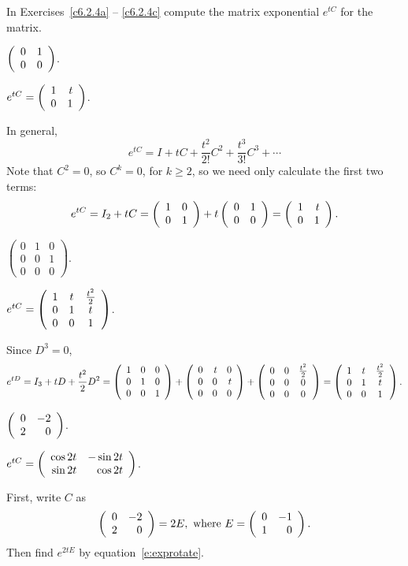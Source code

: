 \documentclass{ximera}
\begin{document}
\TEXER

\noindent In Exercises~\ref{c6.2.4a} -- \ref{c6.2.4c} compute the matrix
exponential $e^{tC}$ for the matrix.
\begin{exercise} \label{c6.2.4a}
                $\left(\begin{array}{rr} 0 & 1\\ 0 &0\end{array}\right)$.

\begin{solution}
\ans $e^{tC} = \left(\begin{array}{rr} 1 & t\\ 0 &1\end{array}\right)$.

\soln In general,
\[
e^{tC} = I + tC + \frac{t^2}{2!}C^2 + \frac{t^3}{3!}C^3 + \cdots
\]
Note that $C^2 = 0$, so $C^k = 0$, for $k \geq 2$, so we need only
calculate the first two terms:
\[
e^{tC} = I_2 + tC = \left(\begin{array}{rr} 1 & 0\\ 0 &1\end{array}\right) + t\left(\begin{array}{rr} 0 & 1\\ 0 &0\end{array}\right) =
\left(\begin{array}{rr} 1 & t\\ 0 &1\end{array}\right).
\]

\end{solution}
\end{exercise}
\begin{exercise} \label{c6.2.4b}
                $\left(\begin{array}{ccc}
                0 & 1 & 0\\
                0 & 0 & 1\\
                0 & 0 & 0 \end{array}\right)$.

\begin{solution}
\ans $e^{tC} =
\left(\begin{array}{ccc} 1 & t & \frac{t^2}{2} \\ 0 & 1 & t \\ 0 & 0 & 1\end{array}\right)$.

\soln Since $D^3 = 0$,
\[
e^{tD} = I_3 + tD + \frac{t^2}{2}D^2 =
\left(\begin{array}{rrr} 1 & 0 & 0 \\ 0 & 1 & 0 \\ 0 & 0 & 1\end{array}\right) +
\left(\begin{array}{rrr} 0 & t & 0 \\ 0 & 0 & t \\ 0 & 0 & 0\end{array}\right) +
\left(\begin{array}{ccc} 0 & 0 & \frac{t^2}{2} \\ 0 & 0 & 0 \\ 0 & 0 & 0\end{array}\right) =
\left(\begin{array}{ccc} 1 & t & \frac{t^2}{2} \\ 0 & 1 & t \\ 0 & 0 & 1\end{array}\right).
\]

\end{solution}
\end{exercise}
\begin{exercise} \label{c6.2.4c}
                $\left(\begin{array}{rr} 0 & -2\\ 2 &0\end{array}\right)$.

\begin{solution}
\ans $e^{tC} =
\left(\begin{array}{rr} \cos 2t & -\sin 2t\\ \sin 2t &\cos 2t\end{array}\right)$.

\soln 
First, write $C$ as
\[
\left(\begin{array}{rr} 0 & -2\\ 2 &0\end{array}\right) = 2E, \hbox{ where } E = \left(\begin{array}{rr} 0 & -1\\ 1 &0\end{array}\right).
\]
Then find $e^{2tE}$ by equation~\eqref{e:exprotate}.

\end{solution}
\end{exercise}
\end{document}
